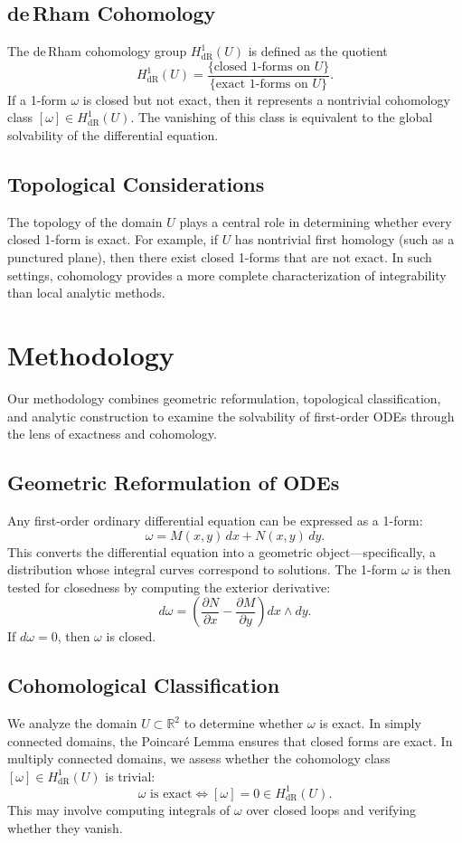 \documentclass{amsart}
\theoremstyle{definition}
\theoremstyle{remark}
\numberwithin{equation}{section}
\begin{document}
\subsection{de\,Rham Cohomology}

The de\,Rham cohomology group \( H^1_{\mathrm{dR}}(U) \) is defined as the quotient
\[
H^1_{\mathrm{dR}}(U) = \frac{\{ \text{closed 1-forms on } U \}}{\{ \text{exact 1-forms on } U \}}.
\]
If a 1-form \( \omega \) is closed but not exact, then it represents a nontrivial cohomology class \( [\omega] \in H^1_{\mathrm{dR}}(U) \). The vanishing of this class is equivalent to the global solvability of the differential equation.

\subsection{Topological Considerations}

The topology of the domain \( U \) plays a central role in determining whether every closed 1-form is exact. For example, if \( U \) has nontrivial first homology (such as a punctured plane), then there exist closed 1-forms that are not exact. In such settings, cohomology provides a more complete characterization of integrability than local analytic methods.

\section{Methodology}

Our methodology combines geometric reformulation, topological classification, and analytic construction to examine the solvability of first-order ODEs through the lens of exactness and cohomology.

\subsection{Geometric Reformulation of ODEs}
Any first-order ordinary differential equation can be expressed as a 1-form:
\[
\omega = M(x, y)\, dx + N(x, y)\, dy.
\]
This converts the differential equation into a geometric object—specifically, a distribution whose integral curves correspond to solutions. The 1-form $\omega$ is then tested for closedness by computing the exterior derivative:
\[
d\omega = \left( \frac{\partial N}{\partial x} - \frac{\partial M}{\partial y} \right) dx \wedge dy.
\]
If $d\omega = 0$, then $\omega$ is closed.

\subsection{Cohomological Classification}
We analyze the domain $U \subset \mathbb{R}^2$ to determine whether $\omega$ is exact. In simply connected domains, the Poincaré Lemma ensures that closed forms are exact. In multiply connected domains, we assess whether the cohomology class $[\omega] \in H^1_{\mathrm{dR}}(U)$ is trivial:
\[
\omega \text{ is exact} \iff [\omega] = 0 \in H^1_{\mathrm{dR}}(U).
\]
This may involve computing integrals of $\omega$ over closed loops and verifying whether they vanish.
\end{document}
